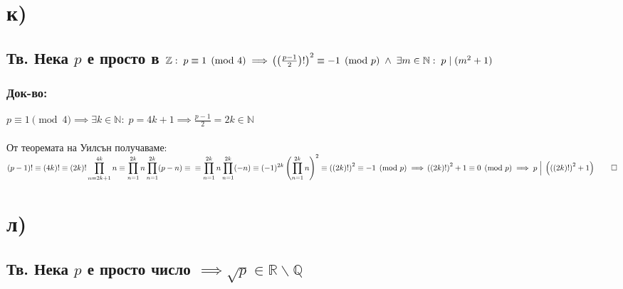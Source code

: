 \documentclass[12pt]{article}
\newcommand{\Z}{\mathbb{Z}}
\newcommand{\N}{\mathbb{N}}
\newcommand{\Q}{\mathbb{Q}}
\newcommand{\R}{\mathbb{R}}
\begin{document}
    \section*{к)}
    \subsection*{Тв. Нека \(p\) е просто в \(\Z: \; p \equiv 1 \pmod 4 \implies \\\\
    \left(\left(\frac{p - 1}{2}\right)!\right)^2 \equiv - 1 \pmod p \; \wedge \; \exists m \in \N : \; p \; | \; (m^2 + 1) \) } 
    \subsubsection*{Док-во:}
    \(p \equiv 1 \pmod 4 \implies \exists k \in \N : \; p = 4k + 1 \implies \frac{p - 1}{2} = 2k \in \N\) \\\\
    От теоремата на Уилсън получаваме: \((p - 1)! \equiv (4k)! \equiv (2k)! \displaystyle\prod_{n = 2k + 1}^{4k}n \equiv \displaystyle\prod_{n = 1}^{2k}n\displaystyle\prod_{n = 1}^{2k}(p - n) \equiv\\\\
    \equiv \displaystyle\prod_{n = 1}^{2k}n\displaystyle\prod_{n = 1}^{2k} (-n) \equiv (-1)^{2k} \left(\displaystyle\prod_{n = 1}^{2k}n\right)^2
    \equiv \left((2k)!\right)^2 \equiv -1 \pmod p \implies \\\\
    \left((2k)!\right)^2 + 1 \equiv 0 \pmod p \implies p \; \Big| \; \left(\left((2k)!\right)^2 + 1\right) \qed \)
    \section*{л)}
    \subsection*{Тв. Нека \(p\) е просто число \(\implies \sqrt{p} \in \R\backslash\Q \) } 
\end{document}

